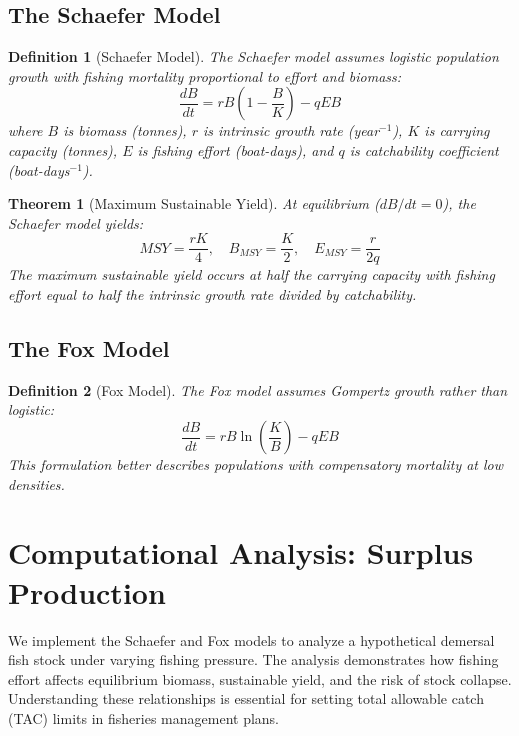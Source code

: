 \documentclass[a4paper, 11pt]{article}
\newtheorem{definition}{Definition}[section]
\newtheorem{theorem}{Theorem}[section]
\begin{document}
\subsection{The Schaefer Model}

\begin{definition}[Schaefer Model]
The Schaefer model assumes logistic population growth with fishing mortality proportional
to effort and biomass:
\begin{equation}
\frac{dB}{dt} = rB\left(1 - \frac{B}{K}\right) - qEB
\end{equation}
where $B$ is biomass (tonnes), $r$ is intrinsic growth rate (year$^{-1}$), $K$ is carrying
capacity (tonnes), $E$ is fishing effort (boat-days), and $q$ is catchability coefficient
(boat-days$^{-1}$).
\end{definition}

\begin{theorem}[Maximum Sustainable Yield]
At equilibrium ($dB/dt = 0$), the Schaefer model yields:
\begin{equation}
MSY = \frac{rK}{4}, \quad B_{MSY} = \frac{K}{2}, \quad E_{MSY} = \frac{r}{2q}
\end{equation}
The maximum sustainable yield occurs at half the carrying capacity with fishing effort
equal to half the intrinsic growth rate divided by catchability.
\end{theorem}

\subsection{The Fox Model}

\begin{definition}[Fox Model]
The Fox model assumes Gompertz growth rather than logistic:
\begin{equation}
\frac{dB}{dt} = rB\ln\left(\frac{K}{B}\right) - qEB
\end{equation}
This formulation better describes populations with compensatory mortality at low densities.
\end{definition}

\section{Computational Analysis: Surplus Production}

We implement the Schaefer and Fox models to analyze a hypothetical demersal fish stock
under varying fishing pressure. The analysis demonstrates how fishing effort affects
equilibrium biomass, sustainable yield, and the risk of stock collapse. Understanding
these relationships is essential for setting total allowable catch (TAC) limits in
fisheries management plans.
\end{document}
